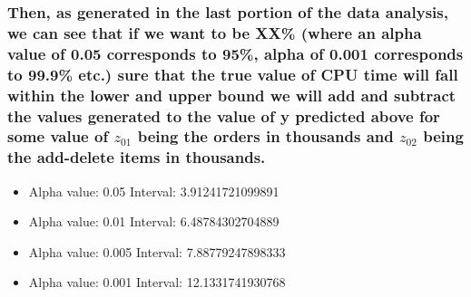 \documentclass[]{article}
\providecommand{\tightlist}{%
  \setlength{\itemsep}{0pt}\setlength{\parskip}{0pt}}
\begin{document}
\hypertarget{then-as-generated-in-the-last-portion-of-the-data-analysis-we-can-see-that-if-we-want-to-be-xx-where-an-alpha-value-of-0.05-corresponds-to-95-alpha-of-0.001-corresponds-to-99.9-etc.-sure-that-the-true-value-of-cpu-time-will-fall-within-the-lower-and-upper-bound-we-will-add-and-subtract-the-values-generated-to-the-value-of-y-predicted-above-for-some-value-of-z_01-being-the-orders-in-thousands-and-z_02-being-the-add-delete-items-in-thousands.}{%
\subsubsection{\texorpdfstring{Then, as generated in the last portion of
the data analysis, we can see that if we want to be XX\% (where an alpha
value of 0.05 corresponds to 95\%, alpha of 0.001 corresponds to 99.9\%
etc.) sure that the true value of CPU time will fall within the lower
and upper bound we will add and subtract the values generated to the
value of y predicted above for some value of \(z_{01}\) being the orders
in thousands and \(z_{02}\) being the add-delete items in
thousands.}{Then, as generated in the last portion of the data analysis, we can see that if we want to be XX\% (where an alpha value of 0.05 corresponds to 95\%, alpha of 0.001 corresponds to 99.9\% etc.) sure that the true value of CPU time will fall within the lower and upper bound we will add and subtract the values generated to the value of y predicted above for some value of z\_\{01\} being the orders in thousands and z\_\{02\} being the add-delete items in thousands.}}\label{then-as-generated-in-the-last-portion-of-the-data-analysis-we-can-see-that-if-we-want-to-be-xx-where-an-alpha-value-of-0.05-corresponds-to-95-alpha-of-0.001-corresponds-to-99.9-etc.-sure-that-the-true-value-of-cpu-time-will-fall-within-the-lower-and-upper-bound-we-will-add-and-subtract-the-values-generated-to-the-value-of-y-predicted-above-for-some-value-of-z_01-being-the-orders-in-thousands-and-z_02-being-the-add-delete-items-in-thousands.}}

\begin{itemize}
\tightlist
\item
  Alpha value: 0.05 Interval: 3.91241721099891
\item
  Alpha value: 0.01 Interval: 6.48784302704889
\item
  Alpha value: 0.005 Interval: 7.88779247898333
\item
  Alpha value: 0.001 Interval: 12.1331741930768
\end{itemize}
\end{document}
